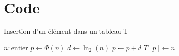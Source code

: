 \documentclass[a4paper, 9pt]{article}
\begin{document}
\section{Code}
\begin{algorithm}
    \caption{Insertion d'un élément dans un tableau T}
    \begin{algorithmic}
    \REQUIRE $n : \text{entier}$
    \STATE $p \gets \Phi(n)$
        \STATE $d \gets \ln_2(n)$
            \STATE $p \gets p + d$
        \ENDWHILE
    \ENDIF
    \STATE $T[p] \gets n$
    \end{algorithmic}
    \end{algorithm}
\end{document}
